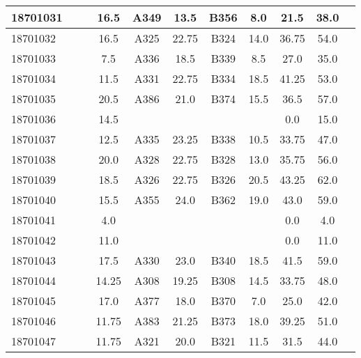 \documentclass[12pt]{article}
\begin{document}
\begin{center}
\begin{small}
\begin{tabular}{|l|c|c|c|c|c|c|c|c|c|c|}
18701031 &  &  & 16.5 & A349 & 13.5 & B356 & 8.0 & 21.5 & 38.0\\ \hline 
18701032 &  &  & 16.5 & A325 & 22.75 & B324 & 14.0 & 36.75 & 54.0\\ \hline 
18701033 &  &  & 7.5 & A336 & 18.5 & B339 & 8.5 & 27.0 & 35.0\\ \hline 
18701034 &  &  & 11.5 & A331 & 22.75 & B334 & 18.5 & 41.25 & 53.0\\ \hline 
18701035 &  &  & 20.5 & A386 & 21.0 & B374 & 15.5 & 36.5 & 57.0\\ \hline 
18701036 &  &  & 14.5 &  &  &  &  & 0.0 & 15.0\\ \hline 
18701037 &  &  & 12.5 & A335 & 23.25 & B338 & 10.5 & 33.75 & 47.0\\ \hline 
18701038 &  &  & 20.0 & A328 & 22.75 & B328 & 13.0 & 35.75 & 56.0\\ \hline 
18701039 &  &  & 18.5 & A326 & 22.75 & B326 & 20.5 & 43.25 & 62.0\\ \hline 
18701040 &  &  & 15.5 & A355 & 24.0 & B362 & 19.0 & 43.0 & 59.0\\ \hline 
18701041 &  &  & 4.0 &  &  &  &  & 0.0 & 4.0\\ \hline 
18701042 &  &  & 11.0 &  &  &  &  & 0.0 & 11.0\\ \hline 
18701043 &  &  & 17.5 & A330 & 23.0 & B340 & 18.5 & 41.5 & 59.0\\ \hline 
18701044 &  &  & 14.25 & A308 & 19.25 & B308 & 14.5 & 33.75 & 48.0\\ \hline 
18701045 &  &  & 17.0 & A377 & 18.0 & B370 & 7.0 & 25.0 & 42.0\\ \hline 
18701046 &  &  & 11.75 & A383 & 21.25 & B373 & 18.0 & 39.25 & 51.0\\ \hline 
18701047 &  &  & 11.75 & A321 & 20.0 & B321 & 11.5 & 31.5 & 44.0\\ \hline 
        \end{tabular}
            \end{small}
            \end{center}
  \centering
            
\end{document}
